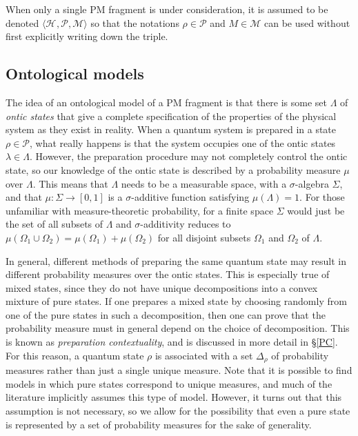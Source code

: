 \documentclass[DIV=calc,fontsize=12pt]{scrartcl} %
\theoremstyle{definition}
\theoremstyle{plain}
\newcommand{\Hilb}[1][]{\ensuremath{\mathcal{H}_{#1}}}
\begin{document}
When only a single PM fragment is under consideration, it is assumed
to be denoted $\langle \Hilb, \mathcal{P}, \mathcal{M} \rangle$ so
that the notations $\rho \in \mathcal{P}$ and $M \in \mathcal{M}$ can
be used without first explicitly writing down the triple.

\subsection{Ontological models}

\label{OM}

The idea of an ontological model of a PM fragment is that there is
some set $\Lambda$ of \emph{ontic states} that give a complete
specification of the properties of the physical system as they exist
in reality.  When a quantum system is prepared in a state $\rho \in
\mathcal{P}$, what really happens is that the system occupies one of
the ontic states $\lambda \in \Lambda$.  However, the preparation
procedure may not completely control the ontic state, so our knowledge
of the ontic state is described by a probability measure $\mu$ over
$\Lambda$.  This means that $\Lambda$ needs to be a measurable space,
with a $\sigma$-algebra $\Sigma$, and that $\mu:\Sigma \rightarrow
[0,1]$ is a $\sigma$-additive function satisfying $\mu(\Lambda) = 1$.
For those unfamiliar with measure-theoretic probability, for a finite
space $\Sigma$ would just be the set of all subsets of $\Lambda$ and
$\sigma$-additivity reduces to $\mu(\Omega_1\cup\Omega_2) =
\mu(\Omega_1) + \mu(\Omega_2)$ for all disjoint subsets $\Omega_1$ and
$\Omega_2$ of $\Lambda$.

In general, different methods of preparing the same quantum state may
result in different probability measures over the ontic states.  This
is especially true of mixed states, since they do not have unique
decompositions into a convex mixture of pure states.  If one prepares
a mixed state by choosing randomly from one of the pure states in such
a decomposition, then one can prove that the probability measure must
in general depend on the choice of decomposition.  This is known as
\emph{preparation contextuality}, and is discussed in more detail in
\S\ref{PC}.  For this reason, a quantum state $\rho$ is associated
with a set $\Delta_{\rho}$ of probability measures rather than just a
single unique measure.  Note that it is possible to find models in
which pure states correspond to unique measures, and much of the
literature implicitly assumes this type of model.  However, it turns
out that this assumption is not necessary, so we allow for the
possibility that even a pure state is represented by a set of
probability measures for the sake of generality.
\end{document}
